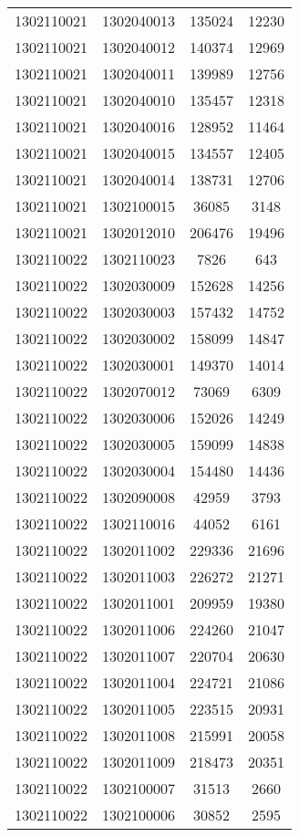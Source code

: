 \begin{longtable}[h]{llcc}
		1302110021 & 1302040013 & 135024 & 12230\\
		1302110021 & 1302040012 & 140374 & 12969\\
		1302110021 & 1302040011 & 139989 & 12756\\
		1302110021 & 1302040010 & 135457 & 12318\\
		1302110021 & 1302040016 & 128952 & 11464\\
		1302110021 & 1302040015 & 134557 & 12405\\
		1302110021 & 1302040014 & 138731 & 12706\\
		1302110021 & 1302100015 & 36085 & 3148\\
		1302110021 & 1302012010 & 206476 & 19496\\
		1302110022 & 1302110023 & 7826 & 643\\
		1302110022 & 1302030009 & 152628 & 14256\\
		1302110022 & 1302030003 & 157432 & 14752\\
		1302110022 & 1302030002 & 158099 & 14847\\
		1302110022 & 1302030001 & 149370 & 14014\\
		1302110022 & 1302070012 & 73069 & 6309\\
		1302110022 & 1302030006 & 152026 & 14249\\
		1302110022 & 1302030005 & 159099 & 14838\\
		1302110022 & 1302030004 & 154480 & 14436\\
		1302110022 & 1302090008 & 42959 & 3793\\
		1302110022 & 1302110016 & 44052 & 6161\\
		1302110022 & 1302011002 & 229336 & 21696\\
		1302110022 & 1302011003 & 226272 & 21271\\
		1302110022 & 1302011001 & 209959 & 19380\\
		1302110022 & 1302011006 & 224260 & 21047\\
		1302110022 & 1302011007 & 220704 & 20630\\
		1302110022 & 1302011004 & 224721 & 21086\\
		1302110022 & 1302011005 & 223515 & 20931\\
		1302110022 & 1302011008 & 215991 & 20058\\
		1302110022 & 1302011009 & 218473 & 20351\\
		1302110022 & 1302100007 & 31513 & 2660\\
		1302110022 & 1302100006 & 30852 & 2595\\

\end{longtable}
